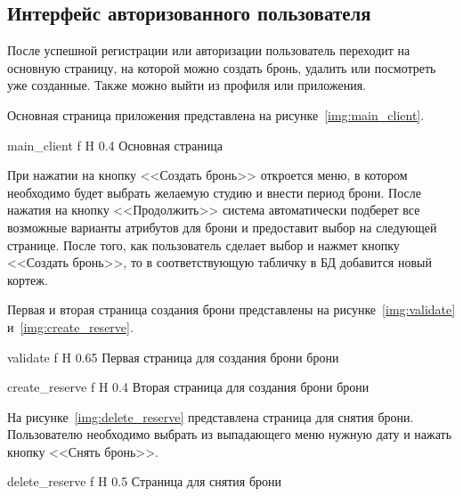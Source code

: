 \subsection{Интерфейс авторизованного пользователя}
После успешной регистрации или авторизации пользователь переходит на основную страницу, на которой можно создать бронь, удалить или посмотреть уже созданные.
Также можно выйти из профиля или приложения.

Основная страница приложения представлена на рисунке~\ref{img:main_client}.




{main_client} %
{f} %
{H} %
{0.4\textwidth} %
{Основная страница} %



При нажатии на кнопку <<Создать бронь>> откроется меню, в котором необходимо будет выбрать желаемую студию и внести период брони.
После нажатия на кнопку <<Продолжить>> система автоматически подберет все возможные варианты атрибутов для брони и предоставит выбор на следующей странице.
После того, как пользователь сделает выбор и нажмет кнопку <<Создать бронь>>, то в соответствующую табличку в БД добавится новый кортеж.

Первая и вторая страница создания брони представлены на рисунке~\ref{img:validate} и~\ref{img:create_reserve}.


{validate} %
{f} %
{H} %
{0.65\textwidth} %
{Первая страница для создания брони брони} %




{create_reserve} %
{f} %
{H} %
{0.4\textwidth} %
{Вторая страница для создания брони брони} %


На рисунке~\ref{img:delete_reserve} представлена страница для снятия брони.
Пользователю необходимо выбрать из выпадающего меню нужную дату и нажать кнопку <<Снять бронь>>.



{delete_reserve} %
{f} %
{H} %
{0.5\textwidth} %
{Страница для снятия брони} %


